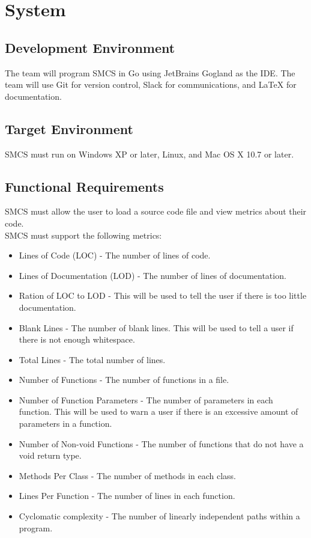 \documentclass{scrreprt}
\begin{document}
	\chapter{System}
	\section{Development Environment}
	The team will program SMCS in Go using JetBrains Gogland as the IDE. The team will use Git for version control, Slack for communications, and LaTeX for documentation.
	\section{Target Environment}
	SMCS must run on Windows XP or later, Linux, and Mac OS X 10.7 or later.
	\section{Functional Requirements}
	SMCS must allow the user to load a source code file and view metrics about their code.\\
	SMCS must support the following metrics:
	\begin{itemize}
		\item Lines of Code (LOC) - The number of lines of code.
		\item Lines of Documentation (LOD) - The number of lines of documentation.
		\item Ration of LOC to LOD - This will be used to tell the user if there is too little documentation.
		\item Blank Lines - The number of blank lines. This will be used to tell a user if there is not enough whitespace.
		\item Total Lines - The total number of lines.
		\item Number of Functions - The number of functions in a file.
		\item Number of Function Parameters - The number of parameters in each function. This will be used to warn a user if there is an excessive amount of parameters in a function.
		\item Number of Non-void Functions - The number of functions that do not have a void return type.
		\item Methods Per Class - The number of methods in each class.
		\item Lines Per Function - The number of lines in each function.
		\item Cyclomatic complexity - The number of linearly independent paths within a program.
	\end{itemize}
\end{document}
